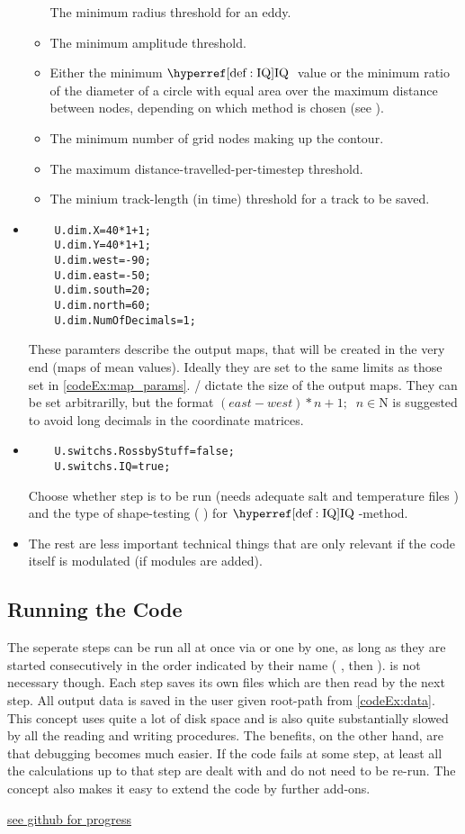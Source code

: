 \begin{itemize}
\begin{itemize}
	The minimum radius threshold for an eddy.
	\item
	The minimum amplitude threshold.
	\item
	Either the minimum $\IQ$ value or the minimum ratio of the diameter of a
circle	 with equal area over the maximum distance between nodes, depending on
which	 method is chosen (see ).
	\item
	The minimum number of grid nodes making up the contour.
	\item
	The maximum distance-travelled-per-timestep threshold.
	\item
	The minium track-length (in time) threshold for a track to be saved.
	\end{itemize}
\item

\begin{lstlisting}
	U.dim.X=40*1+1;
	U.dim.Y=40*1+1;
	U.dim.west=-90;
	U.dim.east=-50;
	U.dim.south=20;
	U.dim.north=60;
	U.dim.NumOfDecimals=1;
\end{lstlisting}
These paramters describe the output maps, that will be created in the very end
(\eg maps of mean values). Ideally they are set to the same limits as
those set in \ref{codeEx:map_params}. / dictate
the size of the output maps. They can be set arbitrarilly, but the format \eg
$(east-west)*n +1; \;\; n \in \mathrm{N}$ is suggested to avoid long decimals in
the coordinate matrices.
\item
\begin{lstlisting}
	U.switchs.RossbyStuff=false;
	U.switchs.IQ=true;
\end{lstlisting}
Choose whether step  is to be run (needs adequate
salt and temperature files ) and the type of shape-testing (
) for $\IQ$-method.
\item
The rest are less important technical things that are only relevant if the code
itself is modulated (\eg if modules are added).
\end{itemize}

\subsection{Running the Code}
The seperate steps can be run all at once via  or one by one, as
long as they are started consecutively in the order indicated by their name
( , then  \etc).  is not necessary
though. Each step saves its own files which are then read by the next step.
All output data is saved in the user given root-path from \ref{codeEx:data}.
This concept uses quite a lot of disk space and is also quite substantially
slowed by all the reading and writing procedures. The benefits, on the other
hand, are that debugging becomes much easier. If the code fails at some step,
at least all the calculations up to that step are dealt with and do not need to
be re-run. The concept also makes it easy to extend the code by further
add-ons.




\href{https://github.com/PremKolar/MT4}{see github for progress}
